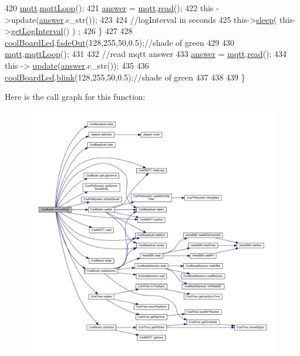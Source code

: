 \begin{DoxyCode}
420         \hyperlink{classCoolBoard_a2399f44d7c23c1149a335cb3b46d90f1}{mqtt}.\hyperlink{classCoolMQTT_aa5eaae967b562b62cbcf2b8d81f6e5d5}{mqttLoop}();
421         \hyperlink{classCoolBoard_a7b835fafd449e5282f7f91d787a2dc15}{answer} = \hyperlink{classCoolBoard_a2399f44d7c23c1149a335cb3b46d90f1}{mqtt}.\hyperlink{classCoolMQTT_ae3c18f6ae9723746d32765f1c8f176ca}{read}();
422         \textcolor{keyword}{this} ->update(\hyperlink{classCoolBoard_a7b835fafd449e5282f7f91d787a2dc15}{answer}.c\_str());
423 
424         \textcolor{comment}{//logInterval in seconds}
425         this->\hyperlink{classCoolBoard_a069952cdcb2e7f68518aa429eceadb6e}{sleep}( this->\hyperlink{classCoolBoard_a7508e029f2ee17bb747ffab599285e0d}{getLogInterval}() ) ;
426     \}
427 
428     \hyperlink{classCoolBoard_a1b1d3c684a5baa56b08486e192fd8e97}{coolBoardLed}.\hyperlink{classCoolBoardLed_a93d545679237e8cc858324367149775c}{fadeOut}(128,255,50,0.5);\textcolor{comment}{//shade of green        }
429 
430     \hyperlink{classCoolBoard_a2399f44d7c23c1149a335cb3b46d90f1}{mqtt}.\hyperlink{classCoolMQTT_aa5eaae967b562b62cbcf2b8d81f6e5d5}{mqttLoop}();
431 
432     \textcolor{comment}{//read mqtt answer}
433     \hyperlink{classCoolBoard_a7b835fafd449e5282f7f91d787a2dc15}{answer} = \hyperlink{classCoolBoard_a2399f44d7c23c1149a335cb3b46d90f1}{mqtt}.\hyperlink{classCoolMQTT_ae3c18f6ae9723746d32765f1c8f176ca}{read}();
434     \textcolor{keyword}{this} -> \hyperlink{classCoolBoard_a8612756d3f73198cdde857a66f0fe690}{update}(\hyperlink{classCoolBoard_a7b835fafd449e5282f7f91d787a2dc15}{answer}.c\_str()); 
435 
436     \hyperlink{classCoolBoard_a1b1d3c684a5baa56b08486e192fd8e97}{coolBoardLed}.\hyperlink{classCoolBoardLed_a96e1ea13003eee34c9dbcef340404426}{blink}(128,255,50,0.5);\textcolor{comment}{//shade of green    }
437 
438 
439 \}
\end{DoxyCode}
Here is the call graph for this function\+:
\nopagebreak
\begin{figure}[H]
\begin{center}
\leavevmode
\includegraphics[width=350pt]{classCoolBoard_aa0bbc4bc605e35618d18e68795c61363_cgraph}
\end{center}
\end{figure}
